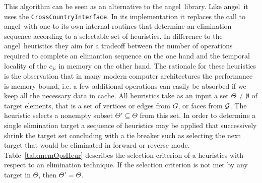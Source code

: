 \documentclass[acmtocl,acmnow]{acmtrans2m}
\newcommand{\angel}{angel}
\newcommand{\code}[1]{{\small\tt{#1}}}
\newcommand{\reftab}[1]{Table~\ref{#1}}
\begin{document}
This algorithm can be seen as an alternative to the \angel\ library. 
Like \angel\ it uses the \code{CrossCountryInterface}. In its implementation 
it replaces the call to \angel\ with one to its own internal routines that
determine an elimination sequence according to a selectable set of heuristics. 
In difference to the \angel\ heuristics  they 
aim for a tradeoff between the number of operations required to complete an elimantion 
sequence on the one hand and the temporal locality of the $c_{ji}$ in memory on the other hand. 
The rationale for these heuristics is the observation that in many modern 
computer architectures the performance is memory bound, i.e. a few additional 
operations can easily be absorbed if we keep all the necessary data in cache. 
All heuristics take as an input a set $\Theta \neq \emptyset $ of target elements, that is 
a set of vertices or edges from $G$, or faces from $\cal G$. 
The heuristic selects a nonempty subset $\Theta'\subseteq \Theta $ from this set. 
In order to determine a single elimination target a sequence of heuristics may be applied 
that successively shrink the target set concluding with a tie breaker such as 
selecting the next target that would be eliminated in forward or reverse mode. 
\reftab{tab:memOpsHeur} describes the selection criterion of a heuristics with 
respect to an elimination technique.  If the selection criterion is not met 
by any target in $\Theta$, then $\Theta'=\Theta$. 
\end{document}
